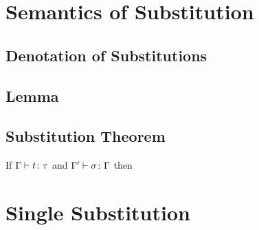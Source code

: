 \documentclass{report}
\renewcommand\s{\sigma}
\newcommand{\sub}[1]{\left\[#1\right\]}
\begin{document}
    \section{Semantics of Substitution}
    \subsection{Denotation of Substitutions}
    \subsection{Lemma}
    \subsection{Substitution Theorem}
    If $\Gamma \vdash t \colon \tau$ and $\typerelation{\G'}{\s}{\G}$ then
    \section{Single Substitution}
\end{document}
